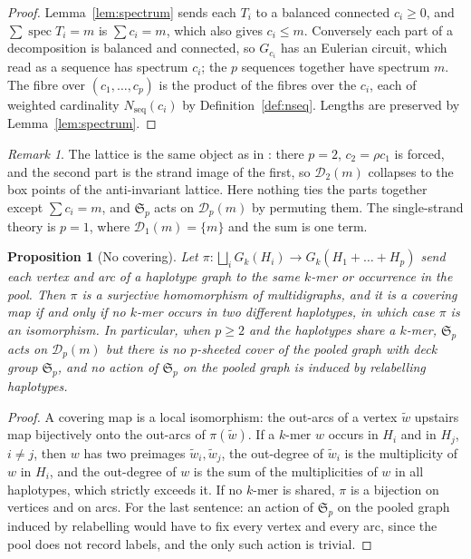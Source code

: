 \documentclass[11pt]{article}
\theoremstyle{plain}
\newtheorem{proposition}[theorem]{Proposition}
\theoremstyle{definition}
\theoremstyle{remark}
\newtheorem{remark}[theorem]{Remark}
\newcommand{\spec}{\operatorname{spec}}
\newcommand{\Nseq}{N_{\mathrm{seq}}}
\newcommand{\Sym}{\mathfrak{S}}
\begin{document}
\begin{proof}
Lemma~\ref{lem:spectrum} sends each $T_i$ to a balanced connected $c_i\ge0$, and
$\sum\spec T_i=m$ is $\sum c_i=m$, which also gives $c_i\le m$. Conversely each part of a
decomposition is balanced and connected, so $G_{c_i}$ has an Eulerian circuit, which read as
a sequence has spectrum $c_i$; the $p$ sequences together have spectrum $m$. The fibre over
$(c_1,\dots,c_p)$ is the product of the fibres over the $c_i$, each of weighted cardinality
$\Nseq(c_i)$ by Definition~\ref{def:nseq}. Lengths are preserved by Lemma~\ref{lem:spectrum}.
\end{proof}

\begin{remark}
The lattice is the same object as in \cite{Bio8}: there $p=2$, $c_2=\rho c_1$ is forced, and
the second part is the strand image of the first, so $\mathcal D_2(m)$ collapses to the box
points of the anti-invariant lattice. Here nothing ties the parts together except $\sum c_i=m$,
and $\Sym_p$ acts on $\mathcal D_p(m)$ by permuting them. The single-strand theory is
$p=1$, where $\mathcal D_1(m)=\{m\}$ and the sum is one term.
\end{remark}

\begin{proposition}[No covering]\label{prop:cover}
Let $\pi\colon\bigsqcup_i G_k(H_i)\to G_k(H_1{+}\dots{+}H_p)$ send each vertex and arc of a
haplotype graph to the same $k$-mer or occurrence in the pool. Then $\pi$ is a surjective
homomorphism of multidigraphs, and it is a covering map if and only if no $k$-mer occurs in
two different haplotypes, in which case $\pi$ is an isomorphism. In particular, when
$p\ge2$ and the haplotypes share a $k$-mer, $\Sym_p$ acts on $\mathcal D_p(m)$ but there is no
$p$-sheeted cover of the pooled graph with deck group $\Sym_p$, and no action of $\Sym_p$ on
the pooled graph is induced by relabelling haplotypes.
\end{proposition}

\begin{proof}
A covering map is a local isomorphism: the out-arcs of a vertex $\tilde w$ upstairs map
bijectively onto the out-arcs of $\pi(\tilde w)$. If a $k$-mer $w$ occurs in $H_i$ and in
$H_j$, $i\ne j$, then $w$ has two preimages $\tilde w_i,\tilde w_j$, the out-degree of
$\tilde w_i$ is the multiplicity of $w$ in $H_i$, and the out-degree of $w$ is the sum of the
multiplicities of $w$ in all haplotypes, which strictly exceeds it. If no $k$-mer is shared,
$\pi$ is a bijection on vertices and on arcs. For the last sentence: an action of $\Sym_p$ on
the pooled graph induced by relabelling would have to fix every vertex and every arc, since
the pool does not record labels, and the only such action is trivial.
\end{proof}
\end{document}
